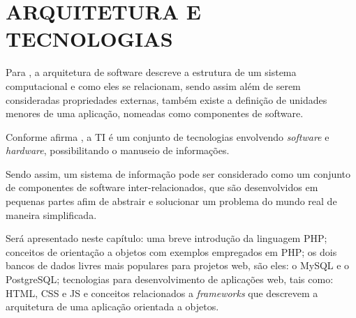 \chapter{ARQUITETURA E TECNOLOGIAS}
\label{tecnologias}
 
Para , a arquitetura de software descreve a
estrutura de um sistema computacional e como eles se relacionam, sendo assim 
além de serem consideradas propriedades externas, também existe a definição de
unidades menores de uma aplicação, nomeadas como componentes de software.

Conforme afirma ,
a \ac{TI} é um conjunto de tecnologias envolvendo \textit{software} e 
\textit{hardware}, possibilitando o manuseio  de informações.

Sendo assim, um sistema de informação pode ser considerado como um conjunto de
componentes de software inter-relacionados, que são desenvolvidos em pequenas 
partes afim de abstrair e solucionar um problema do mundo real de maneira 
simplificada.
 
Será apresentado neste capítulo: uma breve introdução da linguagem \acs{PHP};
conceitos de orientação a objetos com exemplos empregados em \acs{PHP}; os 
dois bancos de dados livres mais populares para projetos web, são eles: o
\acs{MySQL} e o \acs{PostgreSQL}; tecnologias para desenvolvimento de aplicações
web, tais como: \acs{HTML}, \acs{CSS} e \acs{JS} e conceitos relacionados a
\textit{frameworks} que descrevem a arquitetura de uma aplicação orientada a
objetos.






